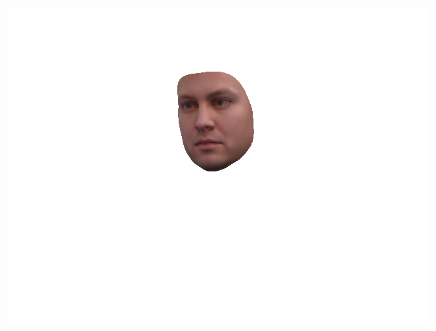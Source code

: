 \begin{figure}[h]
\begin{minipage}{.325\textwidth}
      \includegraphics[width=0.99\textwidth]{Figures/dataset/2D/5.png}
    \end{minipage}


\end{figure}
